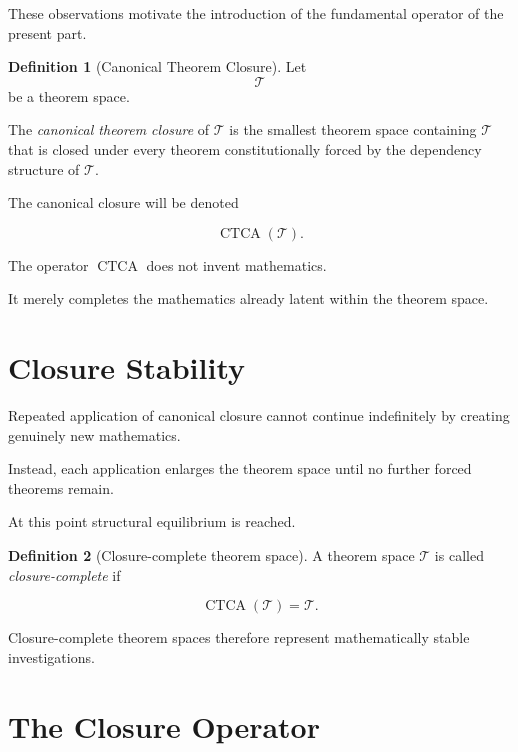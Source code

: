 \documentclass[13pt,openany]{book}
\theoremstyle{plain}
\theoremstyle{definition}
\newtheorem{definition}{Definition}[chapter]
\begin{document}
These observations motivate the introduction of the fundamental operator of
the present part.

\begin{definition}[Canonical Theorem Closure]
Let
\[
\mathcal T
\]
be a theorem space.

The \emph{canonical theorem closure} of
\(\mathcal T\)
is the smallest theorem space containing
\(\mathcal T\)
that is closed under every theorem constitutionally forced by the dependency
structure of
\(\mathcal T\).

The canonical closure will be denoted

\[
\operatorname{CTCA}(\mathcal T).
\]
\end{definition}

The operator
\(\operatorname{CTCA}\)
does not invent mathematics.

It merely completes the mathematics already latent within the theorem space.

\section{Closure Stability}

Repeated application of canonical closure cannot continue indefinitely by
creating genuinely new mathematics.

Instead, each application enlarges the theorem space until no further forced
theorems remain.

At this point structural equilibrium is reached.

\begin{definition}[Closure-complete theorem space]
A theorem space
\(\mathcal T\)
is called \emph{closure-complete} if

\[
\operatorname{CTCA}(\mathcal T)
=
\mathcal T.
\]
\end{definition}

Closure-complete theorem spaces therefore represent mathematically stable
investigations.

\section{The Closure Operator}
\end{document}

